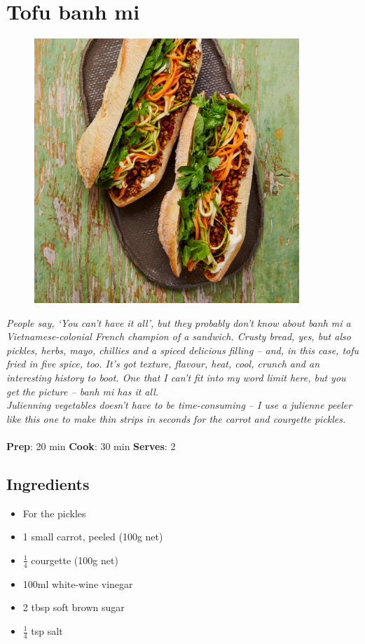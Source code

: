 \documentclass{book}
\begin{document}
\section{Tofu banh mi}
\begin{figure}
\centering\includegraphics[width=10cm,height=10cm,keepaspectratio]{Recipe_Pictures/Tofu_banh_mi.png}
\end{figure}
\emph{People say, ‘You can’t have it all’, but they probably don’t know about banh mi a Vietnamese-colonial French champion of a sandwich. Crusty bread, yes, but also pickles, herbs, mayo, chillies and a spiced delicious filling – and, in this case, tofu fried in five spice, too. It’s got texture, flavour, heat, cool, crunch and an interesting history to boot. One that I can’t fit into my word limit here, but you get the picture – banh mi has it all.\\ 
Julienning vegetables doesn’t have to be time-consuming – I use a julienne peeler like this one to make thin strips in seconds for the carrot and courgette pickles. }\\\\ 
\textbf{Prep}: 20 min
\textbf{Cook}: 30 min
\textbf{Serves}: 2
\subsection*{Ingredients}
\begin{itemize}
\item For the pickles 
\item 1 small carrot, peeled (100g net) 
\item $\frac{1}{4}$ courgette (100g net) 
\item 100ml white-wine vinegar 
\item 2 tbsp soft brown sugar 
\item $\frac{1}{4}$ tsp salt
\end{itemize}
\end{document}
